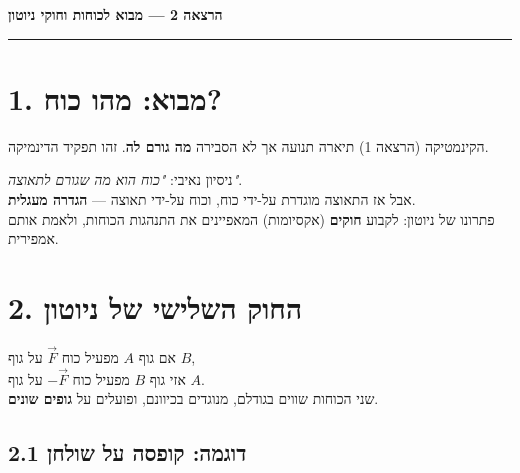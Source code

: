 \documentclass[12pt, a4paper]{article}
\newcommand{\hvec}[1]{\overrightarrow{#1}}
\begin{document}

\begin{center}
  {\LARGE\bfseries הרצאה 2 --- מבוא לכוחות וחוקי ניוטון}\\[6pt]
  \rule{\linewidth}{0.8pt}
\end{center}
\vspace{0.5cm}

\section*{1. מבוא: מהו כוח?}

הקינמטיקה (הרצאה 1) תיארה תנועה אך לא הסבירה \textbf{מה גורם לה}. זהו תפקיד הדינמיקה.

\begin{tcolorbox}[warnbox, title={בעיית ההגדרה המעגלית}]
ניסיון נאיבי: \emph{"כוח הוא מה שגורם לתאוצה"}.\\
אבל אז התאוצה מוגדרת על-ידי כוח, וכוח על-ידי תאוצה --- \textbf{הגדרה מעגלית}.\\[3pt]
פתרונו של ניוטון: לקבוע \textbf{חוקים} (אקסיומות) המאפיינים את התנהגות הכוחות, ולאמת אותם אמפירית.
\end{tcolorbox}

\section*{2. החוק השלישי של ניוטון}

\begin{tcolorbox}[defbox, title={חוק שלישי}]
אם גוף \textenglish{$A$} מפעיל כוח \textenglish{$\hvec{F}$} על גוף \textenglish{$B$},\\
אזי גוף \textenglish{$B$} מפעיל כוח \textenglish{$-\hvec{F}$} על גוף \textenglish{$A$}.\\[3pt]
שני הכוחות שווים בגודלם, מנוגדים בכיוונם, ופועלים על \textbf{גופים שונים}.
\end{tcolorbox}

\subsection*{2.1 דוגמה: קופסה על שולחן}
\end{document}
